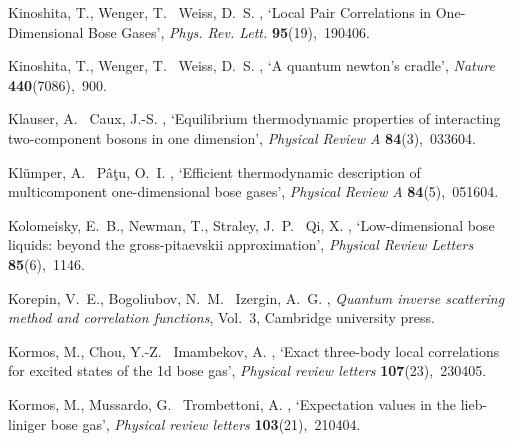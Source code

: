 \documentclass[onecolumn,amsfonts,showpacs,superscriptaddress]{revtex4-1}
\begin{document}
\begin{thebibliography}{xx}
Kinoshita, T., Wenger, T. \harvardand\ Weiss, D.~S.  \harvardyearleft
  2005\harvardyearright , `Local {Pair} {Correlations} in {One}-{Dimensional}
  {Bose} {Gases}', {\em Phys. Rev. Lett.} {\bf 95}(19),~190406.

Kinoshita, T., Wenger, T. \harvardand\ Weiss, D.~S.  \harvardyearleft
  2006\harvardyearright , `A quantum newton's cradle', {\em Nature} {\bf
  440}(7086),~900.

Klauser, A. \harvardand\ Caux, J.-S.  \harvardyearright ,
  `Equilibrium thermodynamic properties of interacting two-component bosons in
  one dimension', {\em Physical Review A} {\bf 84}(3),~033604.

Kl{\"u}mper, A. \harvardand\ P{\^a}{\c{t}}u, O.~I.  \harvardyearleft
  2011\harvardyearright , `Efficient thermodynamic description of
  multicomponent one-dimensional bose gases', {\em Physical Review A} {\bf
  84}(5),~051604.

Kolomeisky, E.~B., Newman, T., Straley, J.~P. \harvardand\ Qi, X.
  \harvardyearright , `Low-dimensional bose liquids:
  beyond the gross-pitaevskii approximation', {\em Physical Review Letters}
  {\bf 85}(6),~1146.

Korepin, V.~E., Bogoliubov, N.~M. \harvardand\ Izergin, A.~G.  \harvardyearleft
  1997\harvardyearright , {\em Quantum inverse scattering method and
  correlation functions}, Vol.~3, Cambridge university press.

Kormos, M., Chou, Y.-Z. \harvardand\ Imambekov, A.  \harvardyearleft
  2011\harvardyearright , `Exact three-body local correlations for excited
  states of the 1d bose gas', {\em Physical review letters} {\bf
  107}(23),~230405.

Kormos, M., Mussardo, G. \harvardand\ Trombettoni, A.  \harvardyearleft
  2009\harvardyearright , `Expectation values in the lieb-liniger bose gas',
  {\em Physical review letters} {\bf 103}(21),~210404.


\end{thebibliography}
\end{document}
